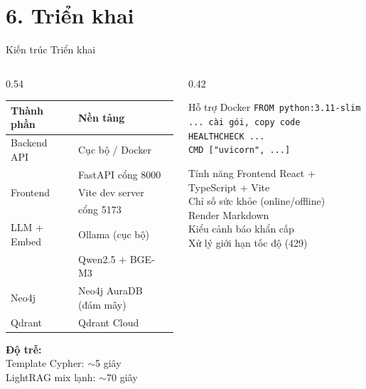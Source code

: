 \documentclass[aspectratio=169, 11pt]{beamer}
\begin{document}
\section{6. Triển khai}

\begin{frame}{Kiến trúc Triển khai}
  \begin{columns}[t]
    \begin{column}{0.54\textwidth}
      \begin{tabular}{ll}
        \toprule
        \textbf{Thành phần} & \textbf{Nền tảng}\\
        \midrule
        Backend API  & Cục bộ / Docker\\
                     & FastAPI cổng 8000\\
        Frontend     & Vite dev server\\
                     & cổng 5173\\
        LLM + Embed  & Ollama (cục bộ)\\
                     & Qwen2.5 + BGE-M3\\
        Neo4j        & Neo4j AuraDB (đám mây)\\
        Qdrant       & Qdrant Cloud\\
        \bottomrule
      \end{tabular}
      \vspace{0.5em}
      \textbf{Độ trễ:}\\
      \quad Template Cypher: $\sim$5 giây\\
      \quad LightRAG mix lạnh: $\sim$70 giây
    \end{column}
    \begin{column}{0.42\textwidth}
      \begin{block}{Hỗ trợ Docker}
        \scriptsize
        \texttt{FROM python:3.11-slim}\\
        \texttt{... cài gói, copy code}\\
        \texttt{HEALTHCHECK ...}\\
        \texttt{CMD ["uvicorn", ...]}
      \end{block}
      \vspace{0.5em}
      \begin{block}{Tính năng Frontend}
        \scriptsize
        React + TypeScript + Vite\\
        Chỉ số sức khỏe (online/offline)\\
        Render Markdown\\
        Kiểu cảnh báo khẩn cấp\\
        Xử lý giới hạn tốc độ (429)
      \end{block}
    \end{column}
  \end{columns}
\end{frame}
\end{document}
